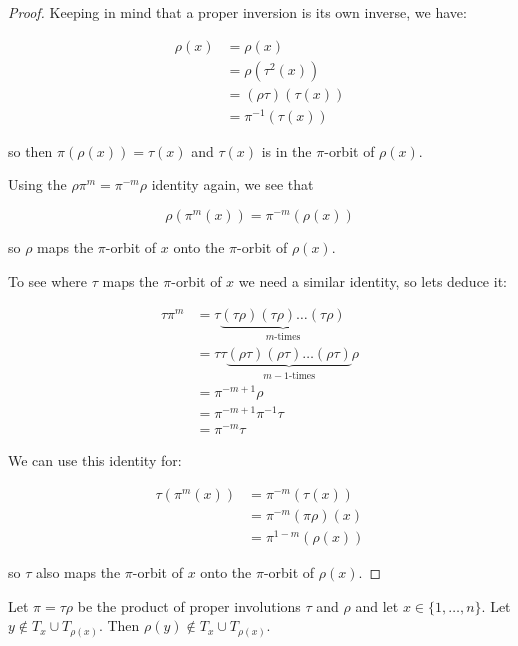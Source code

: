 \begin{proof}

Keeping in mind that a proper inversion is its own inverse, we have:

\begin{align*}
\rho(x) &= \rho(x) \\
        &= \rho(\tau^2(x)) \\
        &= (\rho \tau) (\tau(x)) \\
        &= \pi^{-1} (\tau(x))
\end{align*}

so then $\pi(\rho(x)) = \tau(x)$ and $\tau(x)$ is in the $\pi$-orbit of $\rho(x)$.

Using the $\rho \pi^m = \pi^{-m} \rho$ identity again, we see that

$$
\rho (\pi^m (x)) = \pi^{-m}(\rho(x))
$$

so $\rho$ maps the $\pi$-orbit of $x$ onto the $\pi$-orbit of $\rho(x)$. 

To see where $\tau$ maps the $\pi$-orbit of $x$ we need a similar identity, so lets deduce it:

\begin{align*}
\tau \pi^m &= \tau \underbrace{(\tau\rho) (\tau\rho) \ldots (\tau\rho)}_{m\text{-times}} \\
           &= \tau \tau \underbrace{(\rho\tau) (\rho\tau) \ldots (\rho\tau)}_{m-1\text{-times}} \rho \\
           &= \pi^{-m+1} \rho \\
           &= \pi^{-m+1} \pi^{-1} \tau \\
           &= \pi^{-m} \tau
\end{align*}


We can use this identity for:

\begin{align*}
\tau(\pi^m(x)) &= \pi^{-m}(\tau(x)) \\
               &= \pi^{-m}(\pi\rho)(x) \\
               &= \pi^{1-m} (\rho(x)) 
\end{align*}

so $\tau$ also maps the $\pi$-orbit of $x$ onto the $\pi$-orbit of $\rho(x)$. 

\end{proof}

\begin{thm}\label{involutionproduct3}
Let $\pi = \tau \rho$ be the product of proper involutions $\tau$ and $\rho$ and let $x \in \{1, \ldots, n\}$. Let $y \notin T_x \cup T_{\rho(x)}$. Then $\rho(y) \notin T_x \cup T_{\rho(x)}$.
\end{thm}

